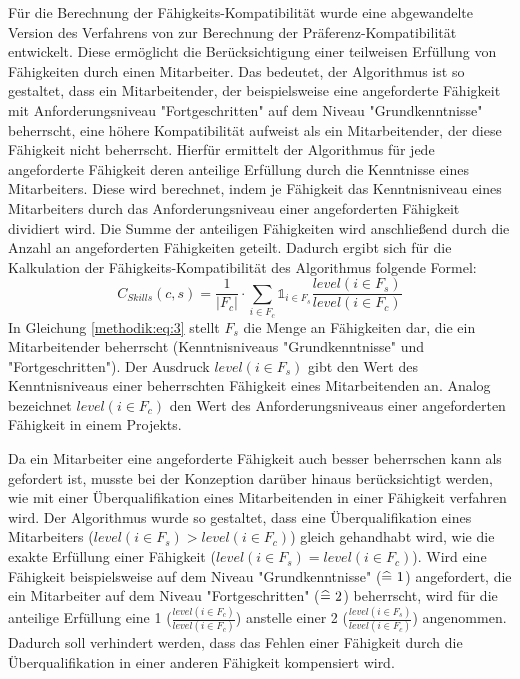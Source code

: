 Für die Berechnung der Fähigkeits-Kompatibilität wurde eine abgewandelte Version des Verfahrens von \textcite[S. 269ff.]{pizzato:2:inproceedings} zur Berechnung der Präferenz-Kompatibilität entwickelt.
Diese ermöglicht die Berücksichtigung einer teilweisen Erfüllung von Fähigkeiten durch einen Mitarbeiter.
Das bedeutet, der Algorithmus ist so gestaltet, dass ein Mitarbeitender, der beispielsweise eine angeforderte Fähigkeit mit Anforderungsniveau "Fortgeschritten" auf dem Niveau "Grundkenntnisse" beherrscht, eine höhere Kompatibilität aufweist als ein Mitarbeitender, der diese Fähigkeit nicht beherrscht.
Hierfür ermittelt der Algorithmus für jede angeforderte Fähigkeit deren anteilige Erfüllung durch die Kenntnisse eines Mitarbeiters.
Diese wird berechnet, indem je Fähigkeit das Kenntnisniveau eines Mitarbeiters durch das Anforderungsniveau einer angeforderten Fähigkeit dividiert wird.
Die Summe der anteiligen Fähigkeiten wird anschließend durch die Anzahl an angeforderten Fähigkeiten geteilt.
Dadurch ergibt sich für die Kalkulation der Fähigkeits-Kompatibilität des Algorithmus folgende Formel:
\begin{equation}\label{methodik:eq:3}
    C_{Skills}(c,s)=\frac{1}{|F_{c}|} \cdot \sum\limits_{i \in F_{c}} \mathbb{1}_{i \in F_{s}} \frac{level(i \in F_{s})}{level(i \in F_{c})}
\end{equation}
In Gleichung \ref{methodik:eq:3} stellt $F_{s}$ die Menge an Fähigkeiten dar, die ein Mitarbeitender beherrscht (Kenntnisniveaus "Grundkenntnisse" und "Fortgeschritten").
Der Ausdruck $level(i \in F_{s})$ gibt den Wert des Kenntnisniveaus einer beherrschten Fähigkeit eines Mitarbeitenden an.
Analog bezeichnet $level(i \in F_{c})$ den Wert des Anforderungsniveaus einer angeforderten Fähigkeit in einem Projekts.

Da ein Mitarbeiter eine angeforderte Fähigkeit auch besser beherrschen kann als gefordert ist, musste bei der Konzeption darüber hinaus berücksichtigt werden, wie mit einer Überqualifikation eines Mitarbeitenden in einer Fähigkeit verfahren wird.
Der Algorithmus wurde so gestaltet, dass eine Überqualifikation eines Mitarbeiters ($level(i \in F_{s}) > level(i \in F_{c})$) gleich gehandhabt wird, wie die exakte Erfüllung einer Fähigkeit ($level(i \in F_{s}) = level(i \in F_{c})$).
Wird eine Fähigkeit beispielsweise auf dem Niveau "Grundkenntnisse" ($\widehat{=} \textnormal{ }1$) angefordert, die ein Mitarbeiter auf dem Niveau "Fortgeschritten" ($\widehat{=} \textnormal{ }2$) beherrscht, wird für die anteilige Erfüllung eine 1 ($\frac{level(i \in F_{c})}{level(i \in F_{c})}$) anstelle einer 2 ($\frac{level(i \in F_{s})}{level(i \in F_{c})}$) angenommen.
Dadurch soll verhindert werden, dass das Fehlen einer Fähigkeit durch die Überqualifikation in einer anderen Fähigkeit kompensiert wird.

